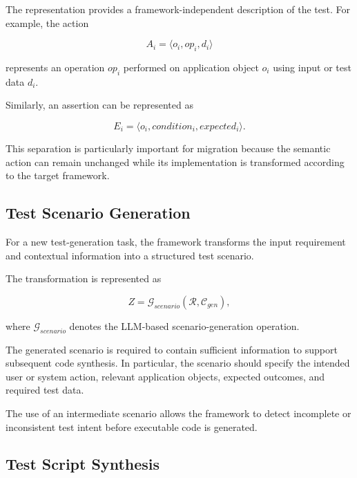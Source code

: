 \documentclass[pdflatex,sn-mathphys-num]{sn-jnl}
\begin{document}
The representation provides a framework-independent description of the
test. For example, the action

\begin{equation}
    A_i =
    \langle
    o_i,
    op_i,
    d_i
    \rangle
\end{equation}

represents an operation $op_i$ performed on application object $o_i$ using
input or test data $d_i$.

Similarly, an assertion can be represented as

\begin{equation}
    E_i =
    \langle
    o_i,
    condition_i,
    expected_i
    \rangle .
\end{equation}

This separation is particularly important for migration because the
semantic action can remain unchanged while its implementation is transformed
according to the target framework.

\subsection{Test Scenario Generation}
\label{subsec:test-scenario-generation}

For a new test-generation task, the framework transforms the input
requirement and contextual information into a structured test scenario.

The transformation is represented as

\begin{equation}
    Z
    =
    \mathcal{G}_{scenario}
    (
        \mathcal{R},
        \mathcal{C}_{gen}
    ),
\label{eq:scenario-generation}
\end{equation}

where $\mathcal{G}_{scenario}$ denotes the LLM-based scenario-generation
operation.

The generated scenario is required to contain sufficient information to
support subsequent code synthesis. In particular, the scenario should
specify the intended user or system action, relevant application objects,
expected outcomes, and required test data.

The use of an intermediate scenario allows the framework to detect
incomplete or inconsistent test intent before executable code is generated.

\subsection{Test Script Synthesis}
\label{subsec:test-script-synthesis}
\end{document}
